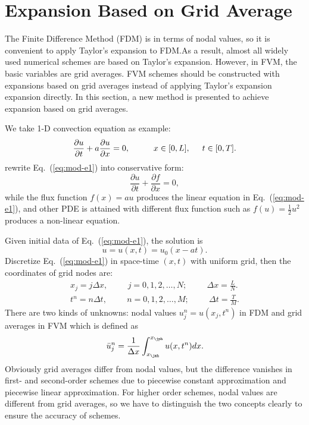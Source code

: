 \documentclass[]{article}
\newcommand{\diff}{d}
\begin{document}
\section{Expansion Based on Grid Average}\label{sec:expansion-based-grid}

The Finite Difference Method (FDM) is in terms of nodal values,
so it is convenient to apply Taylor's expansion to FDM.\@ As a result,
almost all widely used numerical schemes are based on Taylor's expansion. 
However, in FVM, the basic variables are grid averages.  FVM schemes should
be constructed with expansions based on grid averages
instead of applying Taylor's expansion expansion directly. 
In this section, a new method is presented to achieve expansion based on grid
averages.

We take 1-D convection equation as example:
\begin{equation}
    \dfrac{\partial u}{\partial t}+a\dfrac{\partial
    u}{\partial x}=0,\hspace{1cm}x\in [0,L],\hspace{5mm} t\in [0,T].
    \label{eq:mod-e1} 
\end{equation}
rewrite Eq.~(\ref{eq:mod-e1}) into conservative form:
\begin{equation}
    \dfrac{\partial u}{\partial t}+\dfrac{\partial f
    }{\partial x}=0,
    \label{eq:conservative-convection}
\end{equation}
while the flux function $f(x) =au$ produces the linear equation in
Eq.~(\ref{eq:mod-e1}), and other PDE is attained with different flux
function such as $f(u) = \frac 12 u^2$ produces a non-linear equation.

Given initial data of Eq.~(\ref{eq:mod-e1}), the solution is
\begin{equation*}
    u = u(x,t) = u_0(x-at).
\end{equation*}
Discretize Eq.~(\ref{eq:mod-e1}) in space-time $(x, t)$ with uniform grid,
then the coordinates of grid nodes are:
\begin{align*}
    x_j=j \Delta x,\hspace{1cm} j=0,1,2,\ldots,N;\hspace{1cm} \Delta x
    =\frac{L}{N}. \\
    t^n = n\Delta t,\hspace{1cm} n=0,1,2,\ldots,M;\hspace{1cm} \Delta t
    =\frac{T}{M}.
\end{align*}
There are two kinds of unknowns: nodal values $u^n_j=u(x_j,t^n)$ in FDM
and grid averages in FVM which is defined as
\begin{equation}
    \bar u_{j}^n = \frac{1}{\Delta x}\int_{x_{\jmh}}^{x_{\jph}}
    u(x,t^n)\diff x.
    \label{eq:def_grid_avg}
\end{equation}
Obviously grid averages differ from nodal values, but the difference
vanishes in first- and second-order schemes due to piecewise constant
approximation and piecewise linear approximation. For higher order
schemes, nodal values are different from grid averages, so we have to
distinguish the two concepts clearly to ensure the accuracy of
schemes.
\end{document}
